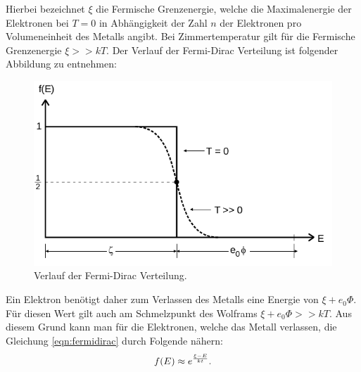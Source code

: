 \noindent
Hierbei bezeichnet $\xi$ die Fermische Grenzenergie, welche die Maximalenergie
der Elektronen bei $T = 0$ in Abhängigkeit der Zahl $n$ der Elektronen pro
Volumeneinheit des Metalls angibt. Bei Zimmertemperatur gilt für die Fermische
Grenzenergie $\xi >> kT$. Der Verlauf der Fermi-Dirac Verteilung ist folgender
Abbildung zu entnehmen:
\begin{figure}[H]
  \centering
  \includegraphics[scale=0.5]{content/fermidirac.png}
  \caption{Verlauf der Fermi-Dirac Verteilung.}
  \label{fig:fermidirac}
\end{figure}
\noindent
Ein Elektron benötigt daher zum Verlassen des Metalls eine Energie von
$\xi + e_0 \Phi$. Für diesen Wert gilt auch am Schmelzpunkt des Wolframs
$\xi + e_0 \Phi >> kT$. Aus diesem Grund kann man für die Elektronen, welche
das Metall verlassen, die Gleichung \eqref{eqn:fermidirac} durch Folgende nähern:
\begin{equation}
  \centering
  f(E) \approx e^{\frac{\xi -E}{kt}}.
  \label{eqn:approxfermidirac}
\end{equation}
\noindent


